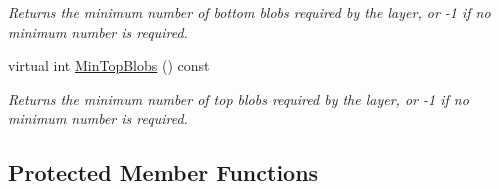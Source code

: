 \begin{DoxyCompactItemize}
\begin{DoxyCompactList}\small\item\em Returns the minimum number of bottom blobs required by the layer, or -\/1 if no minimum number is required. \end{DoxyCompactList}\item 
virtual int \mbox{\hyperlink{classcaffe_1_1_filter_layer_af8c6eb9b1986e03dd14a907b5caa1324}{Min\+Top\+Blobs}} () const
\begin{DoxyCompactList}\small\item\em Returns the minimum number of top blobs required by the layer, or -\/1 if no minimum number is required. \end{DoxyCompactList}\end{DoxyCompactItemize}
\subsection*{Protected Member Functions}
